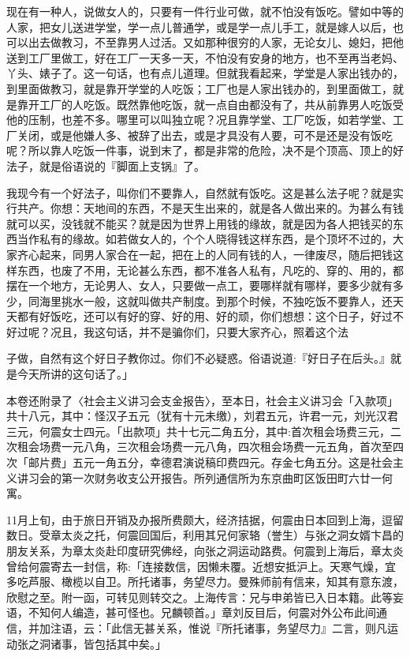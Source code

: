 现在有一种人，说做女人的，只要有一件行业可做，就不怕没有饭吃。譬如中等的人家，把女儿送进学堂，学一点儿普通学，或是学一点儿手工，就是嫁人以后，也可以出去做教习，不至靠男人过活。又如那种很穷的人家，无论女儿、媳妇，把他送到工厂里做工，好在工厂一天多一天，不怕没有安身的地方，也不至再当老妈、丫头、婊子了。这一句话，也有点儿道理。但就我看起来，学堂是人家出钱办的，到里面做教习，就是靠开学堂的人吃饭；工厂也是人家出钱办的，到里面做工，就是靠开工厂的人吃饭。既然靠他吃饭，就一点自由都没有了，共从前靠男人吃饭受他的压制，也差不多。哪里可以叫独立呢？况且靠学堂、工厂吃饭，如若学堂、工厂关闭，或是他嫌人多、被辞了出去，或是才具没有人要，可不是还是没有饭吃呢？所以靠人吃饭一件事，说到末了，都是非常的危险，决不是个顶高、顶上的好法子，就是俗语说的『脚面上支锅』了。

我现今有一个好法子，叫你们不要靠人，自然就有饭吃。这是甚么法子呢？就是实行共产。你想：天地间的东西，不是天生出来的，就是各人做出来的。为甚么有钱就可以买，没钱就不能买？就是因为世界上用钱的缘故，就是因为各人把钱买的东西当作私有的缘故。如若做女人的，个个人晓得钱这样东西，是个顶坏不过的，大家齐心起来，同男人家合在一起，把在上的人同有钱的人，一律废尽，随后把钱这样东西，也废了不用，无论甚么东西，都不准各人私有，凡吃的、穿的、用的，都摆在一个地方，无论男人、女人，只要做一点工，要哪样就有哪样，要多少就有多少，同海里挑水一般，这就叫做共产制度。到那个时候，不独吃饭不要靠人，还天天都有好饭吃，还可以有好的穿、好的用、好的顽，你们想想：这个日子，好过不好过呢？况且，我这句话，并不是骗你们，只要大家齐心，照着这个法


\noindent 子做，自然有这个好日子教你过。你们不必疑惑。俗语说道:『好日子在后头。』就是今天所讲的这句话了。」

本卷还附录了〈社会主义讲习会支金报告〉，至本日，社会主义讲习会「入款项」共十八元，其中：怪汉子五元（犹有十元未缴），刘君五元，许君一元，刘光汉君三元，何震女士四元。「出款项」共十七元二角五分，其中:首次租会场费三元，二次租会场费一元八角，三次租会场费一元八角，四次租会场费一元五角，首次至四次「邮片费」五元一角五分，幸德君演说稿印费四元。存金七角五分。这是社会主义讲习会的第一次财务收支公开报告。所列通信所为东京曲町区饭田町六廿一何寓。

11月上旬，由于旅日开销及办报所费颇大，经济拮据，何震由日本回到上海，逗留数日。受章太炎之托，何震回国后，利用其兄何家辂（誉生）与张之洞女婿卞昌的朋友关系，为章太炎赴印度研究佛经，向张之洞运动路费。何震到上海后，章太炎曾给何震寄去一封信，称:「连接数信，因懒未覆。近想安抵沪上。天寒气燥，宜多吃芦服、橄榄以自卫。所托诸事，务望尽力。曼殊师前有信来，知其有意东渡，欣慰之至。附一函，可转见则转交之。上海传言：兄与申弟皆已入日本籍。此等妄语，不知何人编造，甚可怪也。兄麟顿首。」章刘反目后，何震对外公布此间通信，并加注语，云：「此信无甚关系，惟说『所托诸事，务望尽力』二言，则凡运动张之洞诸事，皆包括其中矣。」


